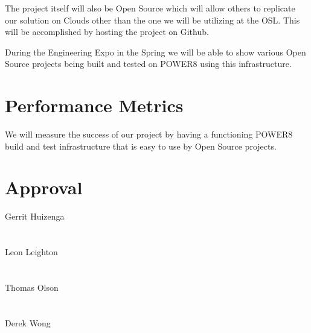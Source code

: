 \documentclass[10pt,letterpaper,onecolumn,draftclsnofoot]{IEEEtran}
\begin{document}
The project itself will also be Open Source which will allow others to replicate our solution on Clouds other than the one we will be utilizing at the OSL\@. 
This will be accomplished by hosting the project on Github. 

During the Engineering Expo in the Spring we will be able to show various Open Source projects being built and tested on POWER8 using this infrastructure.


\section*{Performance Metrics}
We will measure the success of our project by having a functioning POWER8 build and test infrastructure that is easy to use by Open Source projects. 

\clearpage
\section*{Approval}

\noindent Gerrit Huizenga\hspace{0.7cm} \makebox[1.5in]{\hrulefill}\\\\\\
Leon Leighton\hspace{0.7cm} \makebox[1.5in]{\hrulefill}\\\\\\
Thomas Olson\hspace{0.3cm} \makebox[1.5in]{\hrulefill}\\\\\\
Derek Wong\hspace{0.7cm} \makebox[1.5in]{\hrulefill}\\\\\\
\end{document}
